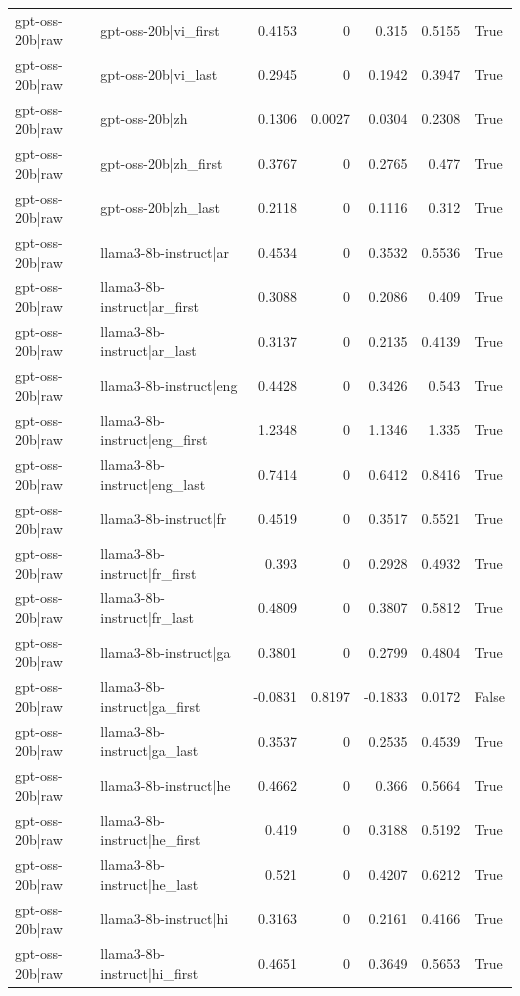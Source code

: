 \begin{table}
\begin{tabular}{l l r r r r l}
gpt-oss-20b|raw & gpt-oss-20b|vi_first & 0.4153 & 0 & 0.315 & 0.5155 & True \\
gpt-oss-20b|raw & gpt-oss-20b|vi_last & 0.2945 & 0 & 0.1942 & 0.3947 & True \\
gpt-oss-20b|raw & gpt-oss-20b|zh & 0.1306 & 0.0027 & 0.0304 & 0.2308 & True \\
gpt-oss-20b|raw & gpt-oss-20b|zh_first & 0.3767 & 0 & 0.2765 & 0.477 & True \\
gpt-oss-20b|raw & gpt-oss-20b|zh_last & 0.2118 & 0 & 0.1116 & 0.312 & True \\
gpt-oss-20b|raw & llama3-8b-instruct|ar & 0.4534 & 0 & 0.3532 & 0.5536 & True \\
gpt-oss-20b|raw & llama3-8b-instruct|ar_first & 0.3088 & 0 & 0.2086 & 0.409 & True \\
gpt-oss-20b|raw & llama3-8b-instruct|ar_last & 0.3137 & 0 & 0.2135 & 0.4139 & True \\
gpt-oss-20b|raw & llama3-8b-instruct|eng & 0.4428 & 0 & 0.3426 & 0.543 & True \\
gpt-oss-20b|raw & llama3-8b-instruct|eng_first & 1.2348 & 0 & 1.1346 & 1.335 & True \\
gpt-oss-20b|raw & llama3-8b-instruct|eng_last & 0.7414 & 0 & 0.6412 & 0.8416 & True \\
gpt-oss-20b|raw & llama3-8b-instruct|fr & 0.4519 & 0 & 0.3517 & 0.5521 & True \\
gpt-oss-20b|raw & llama3-8b-instruct|fr_first & 0.393 & 0 & 0.2928 & 0.4932 & True \\
gpt-oss-20b|raw & llama3-8b-instruct|fr_last & 0.4809 & 0 & 0.3807 & 0.5812 & True \\
gpt-oss-20b|raw & llama3-8b-instruct|ga & 0.3801 & 0 & 0.2799 & 0.4804 & True \\
gpt-oss-20b|raw & llama3-8b-instruct|ga_first & -0.0831 & 0.8197 & -0.1833 & 0.0172 & False \\
gpt-oss-20b|raw & llama3-8b-instruct|ga_last & 0.3537 & 0 & 0.2535 & 0.4539 & True \\
gpt-oss-20b|raw & llama3-8b-instruct|he & 0.4662 & 0 & 0.366 & 0.5664 & True \\
gpt-oss-20b|raw & llama3-8b-instruct|he_first & 0.419 & 0 & 0.3188 & 0.5192 & True \\
gpt-oss-20b|raw & llama3-8b-instruct|he_last & 0.521 & 0 & 0.4207 & 0.6212 & True \\
gpt-oss-20b|raw & llama3-8b-instruct|hi & 0.3163 & 0 & 0.2161 & 0.4166 & True \\
gpt-oss-20b|raw & llama3-8b-instruct|hi_first & 0.4651 & 0 & 0.3649 & 0.5653 & True \\

\end{tabular}
\end{table}
